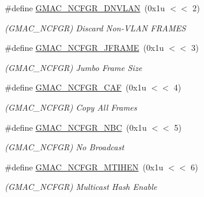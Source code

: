 \begin{DoxyCompactItemize}
\mbox{\label{group__SAME70__GMAC_ga4f173040c3b513a7026508f63b4f4631}} 
\#define \mbox{\hyperlink{group__SAME70__GMAC_ga4f173040c3b513a7026508f63b4f4631}{G\+M\+A\+C\+\_\+\+N\+C\+F\+G\+R\+\_\+\+D\+N\+V\+L\+AN}}~(0x1u $<$$<$ 2)
\begin{DoxyCompactList}\small\item\em (G\+M\+A\+C\+\_\+\+N\+C\+F\+GR) Discard Non-\/\+V\+L\+AN F\+R\+A\+M\+ES \end{DoxyCompactList}\item 
\mbox{\label{group__SAME70__GMAC_ga6cee1ff5af7a4e23016e2ee32aa24faf}} 
\#define \mbox{\hyperlink{group__SAME70__GMAC_ga6cee1ff5af7a4e23016e2ee32aa24faf}{G\+M\+A\+C\+\_\+\+N\+C\+F\+G\+R\+\_\+\+J\+F\+R\+A\+ME}}~(0x1u $<$$<$ 3)
\begin{DoxyCompactList}\small\item\em (G\+M\+A\+C\+\_\+\+N\+C\+F\+GR) Jumbo Frame Size \end{DoxyCompactList}\item 
\mbox{\label{group__SAME70__GMAC_ga69ce10f9318ec8b52be3c1483c9a047a}} 
\#define \mbox{\hyperlink{group__SAME70__GMAC_ga69ce10f9318ec8b52be3c1483c9a047a}{G\+M\+A\+C\+\_\+\+N\+C\+F\+G\+R\+\_\+\+C\+AF}}~(0x1u $<$$<$ 4)
\begin{DoxyCompactList}\small\item\em (G\+M\+A\+C\+\_\+\+N\+C\+F\+GR) Copy All Frames \end{DoxyCompactList}\item 
\mbox{\label{group__SAME70__GMAC_gae4e763f19d21a3cdae1a9b64d2df5937}} 
\#define \mbox{\hyperlink{group__SAME70__GMAC_gae4e763f19d21a3cdae1a9b64d2df5937}{G\+M\+A\+C\+\_\+\+N\+C\+F\+G\+R\+\_\+\+N\+BC}}~(0x1u $<$$<$ 5)
\begin{DoxyCompactList}\small\item\em (G\+M\+A\+C\+\_\+\+N\+C\+F\+GR) No Broadcast \end{DoxyCompactList}\item 
\mbox{\label{group__SAME70__GMAC_ga7dbf1bcaaab412b3245e33c67125d762}} 
\#define \mbox{\hyperlink{group__SAME70__GMAC_ga7dbf1bcaaab412b3245e33c67125d762}{G\+M\+A\+C\+\_\+\+N\+C\+F\+G\+R\+\_\+\+M\+T\+I\+H\+EN}}~(0x1u $<$$<$ 6)
\begin{DoxyCompactList}\small\item\em (G\+M\+A\+C\+\_\+\+N\+C\+F\+GR) Multicast Hash Enable \end{DoxyCompactList}\item 
$$
\end{DoxyCompactItemize}
